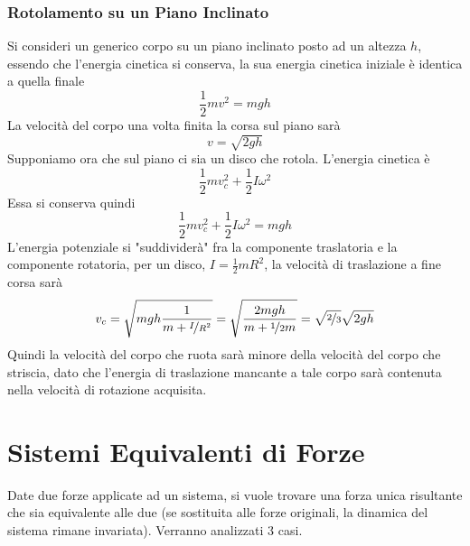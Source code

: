 \documentclass[10pt, letterpaper]{report}
\begin{document}
\subsubsection{Rotolamento su un Piano Inclinato}
Si consideri un generico corpo su un piano inclinato posto ad un altezza $h$, essendo che l'energia cinetica si conserva, la sua energia cinetica iniziale è identica a quella finale 
$$ \frac{1}{2}mv^2=mgh$$
La velocità del corpo una volta finita la corsa sul piano sarà $$ v=\sqrt{2gh}$$
Supponiamo ora che sul piano ci sia un disco che rotola. L'energia cinetica è 
$$ \frac{1}{2}mv_c^2+\frac{1}{2}I\omega ^2$$
Essa si conserva quindi 
$$ \frac{1}{2}mv_c^2+\frac{1}{2}I\omega ^2=mgh$$
L'energia potenziale si "suddividerà" fra la componente traslatoria e la componente rotatoria, per un disco, 
$I=\frac{1}{2}mR^2$, la velocità di traslazione a fine corsa sarà 
$$ v_c=\sqrt{mgh\frac{1}{m+\nicefrac{I}{R^2}}}=\sqrt{\frac{2mgh}{m+\nicefrac{1}{2}m}}=\sqrt{\nicefrac{2}{3}}\sqrt{2gh}$$
Quindi la velocità del corpo che ruota sarà minore della velocità del corpo che striscia, dato che l'energia di traslazione mancante a tale corpo sarà contenuta nella velocità di rotazione acquisita.\flowerLine 
\section{Sistemi Equivalenti di Forze}
Date due forze applicate ad un sistema, si vuole trovare una forza unica risultante che sia equivalente alle due (se sostituita alle forze originali, la dinamica del sistema rimane invariata). Verranno analizzati 3 casi. 
\end{document}

